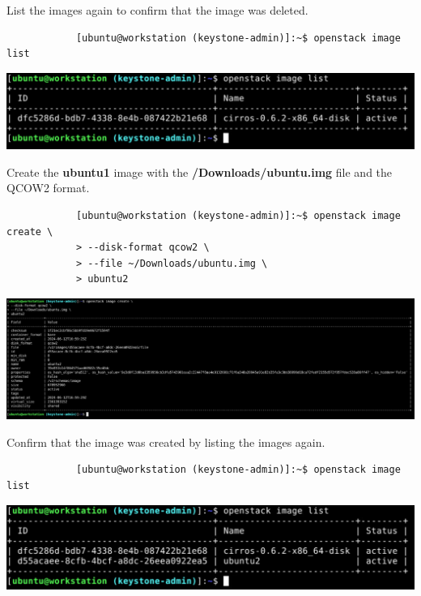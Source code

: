 \documentclass[letterpaper, 12pt]{article}
\begin{document}
\begin{enumerate}
    \begin{labstep}
        List the images again to confirm that the image was deleted.
        \begin{lstlisting}
            [ubuntu@workstation (keystone-admin)]:~$ openstack image list
        \end{lstlisting}

        \begin{center}
            \includegraphics[width=\linewidth]{images/part1/step18.png}
        \end{center}
    \end{labstep}

    \begin{labstep}
        Create the \textbf{ubuntu1} image with the \textbf{\texttildemid/Downloads/ubuntu.img} file and the QCOW2 format.
        \begin{lstlisting}
            [ubuntu@workstation (keystone-admin)]:~$ openstack image create \
            > --disk-format qcow2 \
            > --file ~/Downloads/ubuntu.img \
            > ubuntu2
        \end{lstlisting}

        \begin{center}
            \includegraphics[width=\linewidth]{images/part1/step19.png}
        \end{center}
    \end{labstep}

    \begin{labstep}
        Confirm that the image was created by listing the images again.
        \begin{lstlisting}
            [ubuntu@workstation (keystone-admin)]:~$ openstack image list
        \end{lstlisting}

        \begin{center}
            \includegraphics[width=\linewidth]{images/part1/step20.png}
        \end{center}
    \end{labstep}


\end{enumerate}
\end{document}
